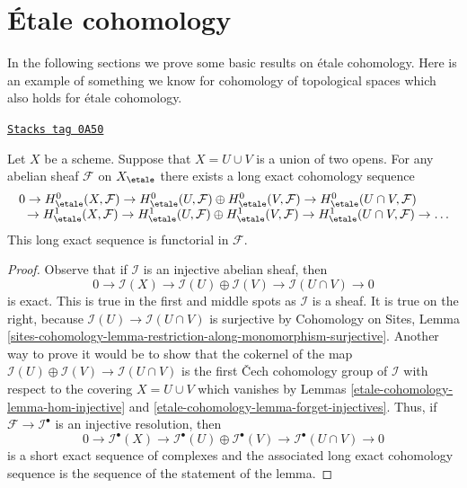 \section{\'Etale cohomology}
\label{etale-cohomology-section-etale-cohomology}
In the following sections we prove some basic results on \'etale cohomology.
Here is an example of something we know for cohomology of topological
spaces which also holds for \'etale cohomology.

\begin{lemma}

\label{etale-cohomology-lemma-mayer-vietoris}
\href{https://stacks.math.columbia.edu/tag/0A50}{\texttt{Stacks tag 0A50}}

Let $X$ be a scheme. Suppose that $X = U \cup V$ is a
union of two opens. For any abelian sheaf $\mathcal{F}$ on $X_\etale$
there exists a long exact cohomology sequence
$$
\begin{matrix}
0 \to
H^0_\etale(X, \mathcal{F}) \to
H^0_\etale(U, \mathcal{F}) \oplus H^0_\etale(V, \mathcal{F}) \to
H^0_\etale(U \cap V, \mathcal{F}) \phantom{\to \ldots} \\
\phantom{0} \to H^1_\etale(X, \mathcal{F}) \to
H^1_\etale(U, \mathcal{F}) \oplus H^1_\etale(V, \mathcal{F}) \to
H^1_\etale(U \cap V, \mathcal{F}) \to \ldots
\end{matrix}
$$
This long exact sequence is functorial in $\mathcal{F}$.
\end{lemma}

\begin{proof}
Observe that if $\mathcal{I}$ is an injective abelian sheaf, then
$$
0 \to \mathcal{I}(X) \to \mathcal{I}(U) \oplus \mathcal{I}(V) \to
\mathcal{I}(U \cap V) \to 0
$$
is exact. This is true in the first and middle spots as $\mathcal{I}$
is a sheaf. It is true on the right, because
$\mathcal{I}(U) \to \mathcal{I}(U \cap V)$ is surjective by
Cohomology on Sites, Lemma
\ref{sites-cohomology-lemma-restriction-along-monomorphism-surjective}.
Another way to prove it would be to show that the cokernel
of the map $\mathcal{I}(U) \oplus \mathcal{I}(V) \to
\mathcal{I}(U \cap V)$ is the first {\v C}ech cohomology group
of $\mathcal{I}$ with respect to the covering
$X = U \cup V$ which vanishes by
Lemmas \ref{etale-cohomology-lemma-hom-injective} and \ref{etale-cohomology-lemma-forget-injectives}.
Thus, if $\mathcal{F} \to \mathcal{I}^\bullet$ is an injective
resolution, then
$$
0 \to \mathcal{I}^\bullet(X) \to
\mathcal{I}^\bullet(U) \oplus \mathcal{I}^\bullet(V) \to
\mathcal{I}^\bullet(U \cap V) \to 0
$$
is a short exact sequence of complexes and the associated long
exact cohomology sequence is the sequence of the statement of the lemma.
\end{proof}

